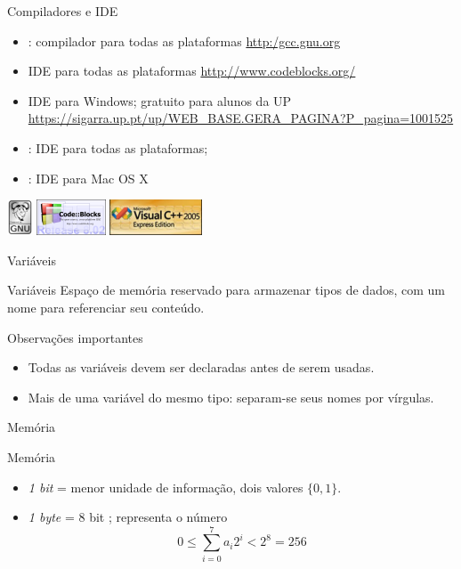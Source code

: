 \documentclass[hyperref={colorlinks=true}]{beamer}
\begin{document}
\begin{frame}{Compiladores e IDE}

\begin{itemize}
\item {}: compilador para todas as plataformas {\tiny \url{http:/gcc.gnu.org}}
\item {} IDE para todas as plataformas {\tiny \url{http://www.codeblocks.org/}}
\item {} IDE para Windows;  gratuito para alunos da UP 
{\tiny \url{https://sigarra.up.pt/up/WEB_BASE.GERA_PAGINA?P_pagina=1001525 }}
\item {}: IDE para todas as plataformas;
\item {}: IDE para Mac OS X
\end{itemize}
\begin{center}\includegraphics{gnu.png}   \includegraphics{CodeBlocks.png}   \includegraphics{MSVisualC++.png}\end{center}
\end{frame}

\begin{frame}{Variáveis}
\begin{block}{Variáveis}
Espaço de memória reservado para armazenar tipos de dados, com um nome para referenciar seu conteúdo.
\end{block}
Observações importantes
\begin{itemize}
 \item Todas as variáveis devem ser declaradas antes de serem usadas.
 \item Mais de uma variável do mesmo tipo: separam-se seus nomes por vírgulas.
\end{itemize}
\end{frame}
\begin{frame}{Memória}
 
\begin{block}{Memória}
\begin{itemize}
\item  {\it 1 bit} = menor unidade de informação, dois valores $\{0,1\}$.
 \item {\it 1 byte} = 8 bit ; representa o número
$$ 0 \leq \sum_{i=0}^7 a_i 2^i < 2^8=256$$
\end{itemize}
\end{block}

\end{frame}
\end{document}
